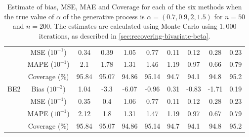 \begin{table}[htbp]
\begin{tabular}{c|c|cccc|cccc}
& MSE ($10^{-1}$)  & 0.34 & 0.39 & 1.05 & 0.77 & 0.11 & 0.12 & 0.28 & 0.23 \\ 
& MAPE ($10^{-1}$)  & 2.1 & 1.78 & 1.31 & 1.46 & 1.19 & 0.97 & 0.66 & 0.79 \\ 
& Coverage (\%)  & 95.84 & 95.07 & 94.86 & 95.14 & 94.7 & 94.1 & 94.8 & 95.2 \\ 
\hline 
\multirow{4}{*}{BE2}& Bias ($10^{-2}$)  & 1.04 & -3.3 & -6.07 & -0.96 & 0.31 & -0.83 & -1.71 & 0.19 \\ 
& MSE ($10^{-1}$)  & 0.35 & 0.4 & 1.06 & 0.77 & 0.11 & 0.12 & 0.28 & 0.23 \\ 
& MAPE ($10^{-1}$)  & 2.12 & 1.8 & 1.31 & 1.47 & 1.19 & 0.97 & 0.67 & 0.79 \\ 
& Coverage (\%)  & 95.84 & 95.07 & 94.86 & 95.14 & 94.7 & 94.1 & 94.8 & 95.2
\end{tabular}
\caption{\label{tab:alpha-experiment3}Estimate of bias, MSE, MAE and Coverage for each of the six methods when the true value of $\alpha$ of the generative process is $\alpha = (0.7, 0.9, 2, 1.5)$ for $n=50$ and $n=200$. 
The estimates are calculated using Monte Carlo using $1,000$ iterations, as described in \autoref{sec:recovering-bivariate-beta}.}
\end{table}